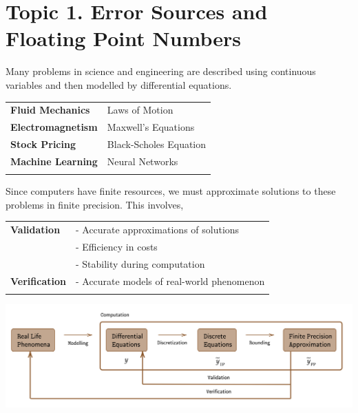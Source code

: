 \section{Topic 1. Error Sources and Floating Point Numbers}
Many problems in science and engineering are described using continuous variables and then  modelled by differential equations.

\begin{table}[h]
\begin{tabularx}{\textwidth}{ll}
\toprule
\textbf{Fluid Mechanics}  & Laws of Motion             \\
\textbf{Electromagnetism} & Maxwell's Equations        \\
\textbf{Stock Pricing}    & Black-Scholes Equation     \\
\textbf{Machine Learning} & Neural Networks \\
\bottomrule \\
\end{tabularx}
\end{table}

\noindent Since computers have finite resources, we must approximate solutions to these problems in finite precision. This involves,

\begin{table}[h]
\begin{tabularx}{\textwidth}{ll}
\toprule
\textbf{Validation}  & - Accurate approximations of solutions \\
                     & - Efficiency in costs \\
                     & - Stability during computation \\
\textbf{Verification} & - Accurate models of real-world phenomenon \\
\bottomrule \\
\end{tabularx}
\end{table}

\begin{center}
       \includegraphics[width=\textwidth]{figures/fig-1.png}
\end{center}

